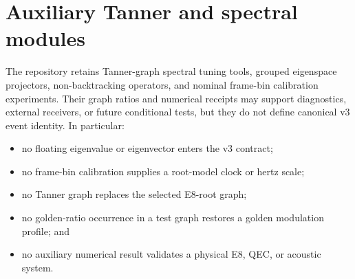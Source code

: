 \documentclass[11pt,a4paper]{article}
\theoremstyle{definition}
\begin{document}
\section{Auxiliary Tanner and spectral modules}
The repository retains Tanner-graph spectral tuning tools, grouped eigenspace projectors, non-backtracking operators, and nominal frame-bin calibration experiments. Their graph ratios and numerical receipts may support diagnostics, external receivers, or future conditional tests, but they do not define canonical v3 event identity. In particular:
\begin{itemize}
\item no floating eigenvalue or eigenvector enters the v3 contract;
\item no frame-bin calibration supplies a root-model clock or hertz scale;
\item no Tanner graph replaces the selected E8-root graph;
\item no golden-ratio occurrence in a test graph restores a golden modulation profile; and
\item no auxiliary numerical result validates a physical E8, QEC, or acoustic system.
\end{itemize}
\end{document}

